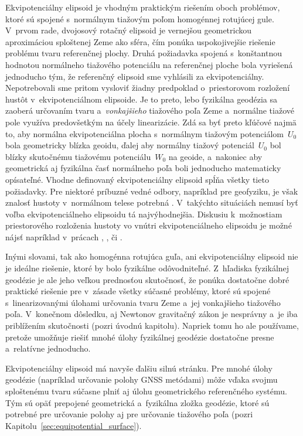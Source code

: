 \documentclass[a4paper, 12pt]{book}
\begin{document}
Ekvipotenciálny elipsoid je vhodným praktickým riešením oboch problémov, ktoré 
sú spojené s~normálnym tiažovým poľom homogénnej rotujúcej gule.  V~prvom rade, 
dvojosový rotačný elipsoid je vernejšou geometrickou aproximáciou sploštenej 
Zeme ako sféra, čím ponúka uspokojivejšie riešenie problému tvaru referenčnej 
plochy.  Druhá požiadavka spojená s~konštantnou hodnotou normálneho tiažového 
potenciálu na referenčnej ploche bola vyriešená jednoducho tým, že referenčný 
elipsoid sme vyhlásili za ekvipotenciálny.  Nepotrebovali sme pritom vysloviť 
žiadny predpoklad o~priestorovom rozložení hustôt v~ekvipotenciálnom elipsoide.  
Je to preto, lebo fyzikálna geodézia sa zaoberá určovaním tvaru 
a~\emph{vonkajšieho} tiažového poľa Zeme a~normálne tiažové pole využíva 
predovšetkým na účely linearizácie.  Zdá sa byť preto kľúčové najmä to, aby 
normálna ekvipotenciálna plocha s~normálnym tiažovým potenciálom~$U_0$ bola 
geometricky blízka geoidu, ďalej aby normálny tiažový potenciál~$U_0$ bol 
blízky skutočnému tiažovému potenciálu~$W_0$ na geoide, a~nakoniec aby 
geometrická aj fyzikálna časť normálneho poľa boli jednoducho matematicky 
opísateľné.  Vhodne definovaný ekvipotenciálny elipsoid spĺňa všetky tieto 
požiadavky.  Pre niektoré príbuzné vedné odbory, napríklad pre geofyziku, je 
však znalosť hustoty v~normálnom telese potrebná \parencite{Karcol2017}.  
V~takýchto situáciách nemusí byť voľba ekvipotenciálneho elipsoidu tá 
najvýhodnejšia.  Diskusiu k~možnostiam priestorového rozloženia hustoty vo 
vnútri ekvipotenciálneho elipsoidu je možné nájsť napríklad v~prácach 
\textcite{MoritzTheFigureOfTheEarth}, \textcite{Conway2000}, 
\textcite{TorgeGeodesy} či \textcite{Karcol2017}.

Inými slovami, tak ako homogénna rotujúca guľa, ani ekvipotenciálny elipsoid 
nie je ideálne riešenie, ktoré by bolo fyzikálne odôvodniteľné.  Z~hľadiska 
fyzikálnej geodézie je ale jeho veľkou prednosťou skutočnosť, že ponúka 
dostatočne dobré praktické riešenie pre v~zásade všetky súčasné problémy, ktoré 
sú spojené s~linearizovanými úlohami určovania tvaru Zeme a~jej vonkajšieho 
tiažového poľa.  V~konečnom dôsledku, aj Newtonov gravitačný zákon je nesprávny 
a~je iba priblížením skutočnosti (pozri úvodnú kapitolu).  Napriek tomu ho ale 
používame, pretože umožňuje riešiť mnohé úlohy fyzikálnej geodézie dostatočne 
presne a~relatívne jednoducho.

Ekvipotenciálny elipsoid má navyše ďalšiu silnú stránku.  Pre mnohé úlohy 
geodézie (napríklad určovanie polohy GNSS metódami) môže vďaka svojmu 
sploštenému tvaru súčasne plniť aj úlohu geometrického referenčného systému.  
Tým sú opäť prepojené geometrická a~fyzikálna zložka geodézie, ktoré sú 
potrebné pre určovanie polohy aj pre určovanie tiažového poľa (pozri 
Kapitolu~\ref{sec:equipotential_surface}).
\end{document}
